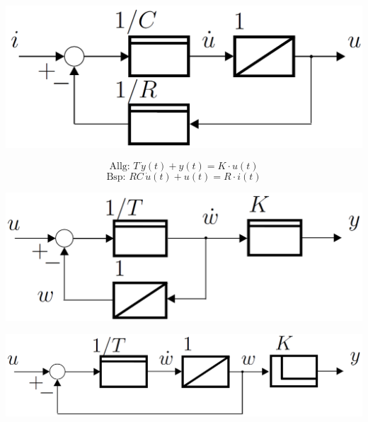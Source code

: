 
\begin{minipage}{0.48\columnwidth}
    \includegraphics[width=\columnwidth]{images/pT1_blockschaltbild}
\end{minipage}
\hfill
\begin{minipage}{0.48\columnwidth}
    $$ \boxed{ \text{Allg: } T \, \dot{y}(t) + y(t) = K \cdot u(t) }  $$
    $$ \boxed{ \text{Bsp: } RC \, \dot{u}(t) + u(t) = R \cdot i(t) }  $$
\end{minipage}



\begin{minipage}{0.48\columnwidth}
    \begin{center}
    \end{center}
    \includegraphics[width=0.98\columnwidth]{images/pT1_blockschaltbild_2}
\end{minipage}
\hfill
\begin{minipage}{0.48\columnwidth}
    \begin{center}
    \end{center}
    \includegraphics[width=0.98\columnwidth]{images/DT1-glied_blockschaltbild}
\end{minipage}


